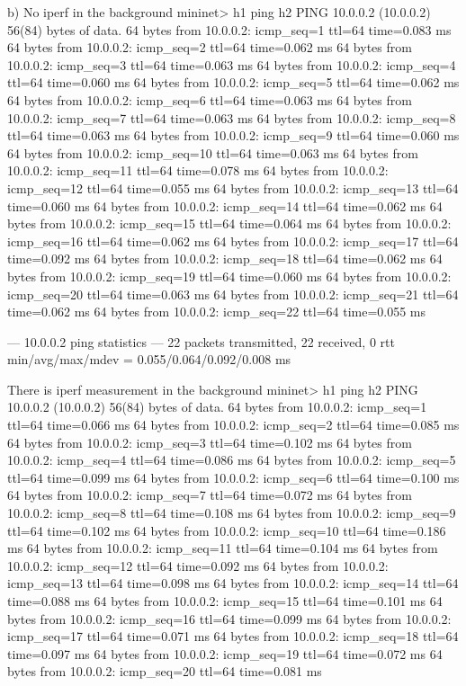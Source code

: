 		b)				No iperf in the background
						mininet> h1 ping h2
						PING 10.0.0.2 (10.0.0.2) 56(84) bytes of data.
						64 bytes from 10.0.0.2: icmp_seq=1 ttl=64 time=0.083 ms
						64 bytes from 10.0.0.2: icmp_seq=2 ttl=64 time=0.062 ms
						64 bytes from 10.0.0.2: icmp_seq=3 ttl=64 time=0.063 ms
						64 bytes from 10.0.0.2: icmp_seq=4 ttl=64 time=0.060 ms
						64 bytes from 10.0.0.2: icmp_seq=5 ttl=64 time=0.062 ms
						64 bytes from 10.0.0.2: icmp_seq=6 ttl=64 time=0.063 ms
						64 bytes from 10.0.0.2: icmp_seq=7 ttl=64 time=0.063 ms
						64 bytes from 10.0.0.2: icmp_seq=8 ttl=64 time=0.063 ms
						64 bytes from 10.0.0.2: icmp_seq=9 ttl=64 time=0.060 ms
						64 bytes from 10.0.0.2: icmp_seq=10 ttl=64 time=0.063 ms
						64 bytes from 10.0.0.2: icmp_seq=11 ttl=64 time=0.078 ms
						64 bytes from 10.0.0.2: icmp_seq=12 ttl=64 time=0.055 ms
						64 bytes from 10.0.0.2: icmp_seq=13 ttl=64 time=0.060 ms
						64 bytes from 10.0.0.2: icmp_seq=14 ttl=64 time=0.062 ms
						64 bytes from 10.0.0.2: icmp_seq=15 ttl=64 time=0.064 ms
						64 bytes from 10.0.0.2: icmp_seq=16 ttl=64 time=0.062 ms
						64 bytes from 10.0.0.2: icmp_seq=17 ttl=64 time=0.092 ms
						64 bytes from 10.0.0.2: icmp_seq=18 ttl=64 time=0.062 ms
						64 bytes from 10.0.0.2: icmp_seq=19 ttl=64 time=0.060 ms
						64 bytes from 10.0.0.2: icmp_seq=20 ttl=64 time=0.063 ms
						64 bytes from 10.0.0.2: icmp_seq=21 ttl=64 time=0.062 ms
						64 bytes from 10.0.0.2: icmp_seq=22 ttl=64 time=0.055 ms
						
						--- 10.0.0.2 ping statistics ---
						22 packets transmitted, 22 received, 0%
						rtt min/avg/max/mdev = 0.055/0.064/0.092/0.008 ms

						There is iperf measurement in the background
						mininet> h1 ping h2
						PING 10.0.0.2 (10.0.0.2) 56(84) bytes of data.
						64 bytes from 10.0.0.2: icmp_seq=1 ttl=64 time=0.066 ms
						64 bytes from 10.0.0.2: icmp_seq=2 ttl=64 time=0.085 ms
						64 bytes from 10.0.0.2: icmp_seq=3 ttl=64 time=0.102 ms
						64 bytes from 10.0.0.2: icmp_seq=4 ttl=64 time=0.086 ms
						64 bytes from 10.0.0.2: icmp_seq=5 ttl=64 time=0.099 ms
						64 bytes from 10.0.0.2: icmp_seq=6 ttl=64 time=0.100 ms
						64 bytes from 10.0.0.2: icmp_seq=7 ttl=64 time=0.072 ms
						64 bytes from 10.0.0.2: icmp_seq=8 ttl=64 time=0.108 ms
						64 bytes from 10.0.0.2: icmp_seq=9 ttl=64 time=0.102 ms
						64 bytes from 10.0.0.2: icmp_seq=10 ttl=64 time=0.186 ms
						64 bytes from 10.0.0.2: icmp_seq=11 ttl=64 time=0.104 ms
						64 bytes from 10.0.0.2: icmp_seq=12 ttl=64 time=0.092 ms
						64 bytes from 10.0.0.2: icmp_seq=13 ttl=64 time=0.098 ms
						64 bytes from 10.0.0.2: icmp_seq=14 ttl=64 time=0.088 ms
						64 bytes from 10.0.0.2: icmp_seq=15 ttl=64 time=0.101 ms
						64 bytes from 10.0.0.2: icmp_seq=16 ttl=64 time=0.099 ms
						64 bytes from 10.0.0.2: icmp_seq=17 ttl=64 time=0.071 ms
						64 bytes from 10.0.0.2: icmp_seq=18 ttl=64 time=0.097 ms
						64 bytes from 10.0.0.2: icmp_seq=19 ttl=64 time=0.072 ms
						64 bytes from 10.0.0.2: icmp_seq=20 ttl=64 time=0.081 ms
						

